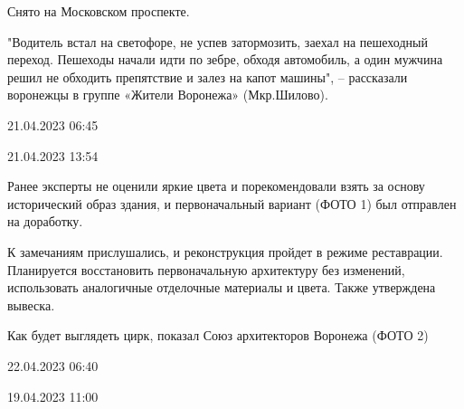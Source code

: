 \documentclass{article}
\date{\today}
\begin{document}
\maketitle
\begin{multicols}{3}

\begin{window} 
Снято на Московском проспекте.

"Водитель встал на светофоре, не успев затормозить, заехал на пешеходный переход. Пешеходы начали идти по зебре, обходя автомобиль, а один мужчина решил не обходить препятствие и залез на капот машины", – рассказали воронежцы в группе «Жители Воронежа» (Мкр.Шилово).

21.04.2023 06:45\end{window}
\closearticle
{}

\begin{window}

21.04.2023 13:54 \end{window}
\closearticle
{}

\begin{window} 
 Ранее эксперты не оценили яркие цвета и порекомендовали взять за основу исторический образ здания, и первоначальный вариант (ФОТО 1)  был отправлен на доработку. 

К замечаниям прислушались, и реконструкция пройдет в режиме реставрации. Планируется восстановить первоначальную архитектуру без изменений, использовать аналогичные отделочные материалы и цвета. Также утверждена вывеска. 

Как будет выглядеть цирк, показал Союз архитекторов Воронежа (ФОТО 2)

22.04.2023 06:40\end{window}
\closearticle
{}



19.04.2023 11:00\closearticle
{}




\end{multicols}
\end{document}
